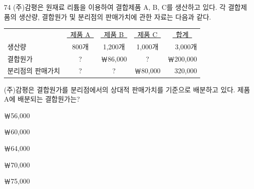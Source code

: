 \begin{question}{74}
(주)감평은 원재료 리튬을 이용하여 결합제품 A, B, C를 생산하고 있다. 각 결합제품의 생산량, 결합원가 및 분리점의 판매가치에 관한 자료는 다음과 같다.
\begin{tcolorbox}[enhanced, colback=white, colframe=black, boxrule=0.4pt, arc=0pt, left=4pt, right=4pt, top=4pt, bottom=4pt]
\begin{tabular}{@{}l c c c r@{}}
 & \uline{\ 제품 A\ } & \uline{\ 제품 B\ } & \uline{\ 제품 C\ } & \multicolumn{1}{c}{\uline{\ 합계\ }} \\
생산량 & 800개 & 1,200개 & 1,000개 & 3,000개 \\
결합원가 & ? & ￦86,000 & ? & ￦200,000 \\
분리점의 판매가치 & ? & ? & ￦80,000 & 320,000
\end{tabular}
\end{tcolorbox}
(주)감평은 결합원가를 분리점에서의 상대적 판매가치를 기준으로 배분하고 있다. 제품 A에 배분되는 결합원가는?
\begin{choices}
  \item ￦56,000
  \item ￦60,000
  \item ￦64,000
  \item ￦70,000
  \item ￦75,000
\end{choices}
\end{question}
